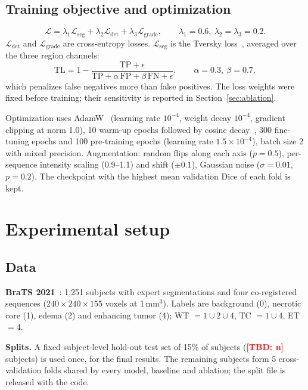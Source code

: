 \documentclass[pdflatex,sn-mathphys-num]{sn-jnl}
\newcommand{\tbd}[1][]{\textcolor{red}{\textbf{[TBD#1]}}}
\begin{document}
\subsection{Training objective and optimization}
\begin{equation}
\mathcal{L}=\lambda_1\mathcal{L}_{\mathrm{seg}}+\lambda_2\mathcal{L}_{\mathrm{det}}+\lambda_3\mathcal{L}_{\mathrm{grade}},\qquad\lambda_1=0.6,\ \lambda_2=\lambda_3=0.2.
\end{equation}
$\mathcal{L}_{\mathrm{det}}$ and $\mathcal{L}_{\mathrm{grade}}$ are cross-entropy losses. $\mathcal{L}_{\mathrm{seg}}$ is the Tversky loss~\cite{salehi2017tversky}, averaged over the three region channels:
\begin{equation}
\mathrm{TL}=1-\frac{\mathrm{TP}+\epsilon}{\mathrm{TP}+\alpha\,\mathrm{FP}+\beta\,\mathrm{FN}+\epsilon},\qquad\alpha=0.3,\ \beta=0.7,
\end{equation}
which penalizes false negatives more than false positives. The loss weights were fixed before training; their sensitivity is reported in Section~\ref{sec:ablation}.

Optimization uses AdamW~\cite{loshchilov2019adamw} (learning rate $10^{-4}$, weight decay $10^{-4}$, gradient clipping at norm 1.0), 10 warm-up epochs followed by cosine decay~\cite{loshchilov2017sgdr}, 300 fine-tuning epochs and 100 pre-training epochs (learning rate $1.5\times10^{-4}$), batch size 2 with mixed precision. Augmentation: random flips along each axis ($p=0.5$), per-sequence intensity scaling (0.9--1.1) and shift ($\pm0.1$), Gaussian noise ($\sigma=0.01$, $p=0.2$). The checkpoint with the highest mean validation Dice of each fold is kept.

\section{Experimental setup}\label{sec:setup}

\subsection{Data}
\textbf{BraTS 2021}~\cite{baid2021brats}: 1,251 subjects with expert segmentations and four co-registered sequences ($240\times240\times155$ voxels at 1\,mm$^3$). Labels are background (0), necrotic core (1), edema (2) and enhancing tumor (4); WT $=1\cup2\cup4$, TC $=1\cup4$, ET $=4$.

\textbf{Splits.} A fixed subject-level hold-out test set of 15\% of subjects (\tbd[: n] subjects) is used once, for the final results. The remaining subjects form 5 cross-validation folds shared by every model, baseline and ablation; the split file is released with the code.
\end{document}
